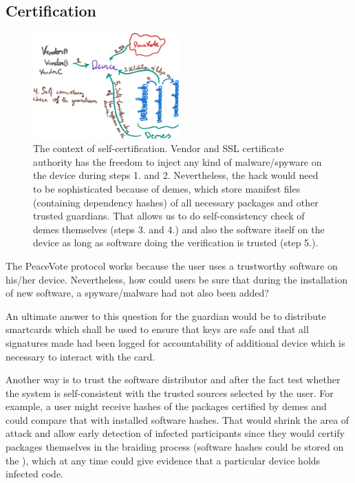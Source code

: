 \documentclass[12pt,a4paper]{article}
\let\Oldsubsection\subsection
\renewcommand{\subsection}{\FloatBarrier\Oldsubsection}
\renewcommand{\texttt}[1]{\jlinl{#1}}
\let\oldincludegraphics\includegraphics
\renewcommand{\includegraphics}[1]{\oldincludegraphics[width=0.5\textwidth]{#1}}
\begin{document}
\subsection{Certification}
\begin{figure}
\centering
\includegraphics{figures/certification}
\caption{The context of self-certification. Vendor and SSL certificate authority has the freedom to inject any kind of malware/spyware on the device during steps 1. and 2. Nevertheless, the hack would need to be sophisticated because of demes, which store manifest files (containing dependency hashes) of all necessary packages and other trusted guardians. That allows us to do self-consistency check of demes themselves (steps 3. and 4.) and also the software itself on the device as long as software doing the verification is trusted (step 5.).}
\end{figure}
\par
The PeaceVote protocol works because the user uses a trustworthy software on his/her device. Nevertheless, how could users be sure that during the installation of new software, a spyware/malware had not also been added?\par
An ultimate answer to this question for the guardian would be to distribute smartcards which shall be used to ensure that keys are safe and that all signatures made had been logged for accountability of additional device which is necessary to interact with the card.\par
Another way is to trust the software distributor and after the fact test whether the system is self-consistent with the trusted sources selected by the user. For example, a user might receive hashes of the packages certified by demes and could compare that with installed software hashes. That would shrink the area of attack and allow early detection of infected participants since they would certify packages themselves in the braiding process (software hashes could be stored on the \texttt{BraidChain}), which at any time could give evidence that a particular device holds infected code.\par
\end{document}
